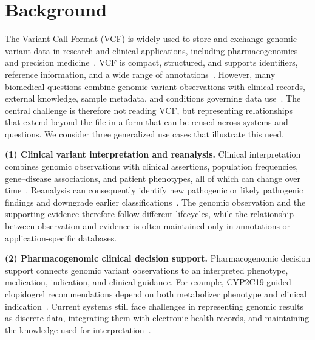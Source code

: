 \documentclass[pdflatex,sn-mathphys-num]{sn-jnl}
\begin{document}
\section{Background}\label{sec:background}
The Variant Call Format (VCF) is widely used to store and exchange genomic variant data in research and clinical applications, including pharmacogenomics and precision medicine~\cite{vcf_spec_2024,pharmcat,souche_recommendations_2022}.
VCF is compact, structured, and supports identifiers, reference information, and a wide range of annotations~\cite{vcf_spec_2024,BCFtools}.
However, many biomedical questions combine genomic variant observations with clinical records, external knowledge, sample metadata, and conditions governing data use~\cite{gottesman2013emerge,allofus2024genomic,rehm2021ga4gh}.
The central challenge is therefore not reading VCF, but representing relationships that extend beyond the file in a form that can be reused across systems and questions.
We consider three generalized use cases that illustrate this need.

\textbf{(1) Clinical variant interpretation and reanalysis.}\label{uc:reanalysis}
Clinical interpretation combines genomic observations with clinical assertions, population frequencies, gene--disease associations, and patient phenotypes, all of which can change over time~\cite{richards2015standards,deignan2019reevaluation}.
Reanalysis can consequently identify new pathogenic or likely pathogenic findings and downgrade earlier classifications~\cite{hiatt2018systematic}.
The genomic observation and the supporting evidence therefore follow different lifecycles, while the relationship between observation and evidence is often maintained only in annotations or application-specific databases.

\textbf{(2) Pharmacogenomic clinical decision support.}\label{uc:pgx}
Pharmacogenomic decision support connects genomic variant observations to an interpreted phenotype, medication, indication, and clinical guidance.
For example, CYP2C19-guided clopidogrel recommendations depend on both metabolizer phenotype and clinical indication~\cite{lee2022clopidogrel}.
Current systems still face challenges in representing genomic results as discrete data, integrating them with electronic health records, and maintaining the knowledge used for interpretation~\cite{wake2022pgx,johnson2024genetically}.
\end{document}
